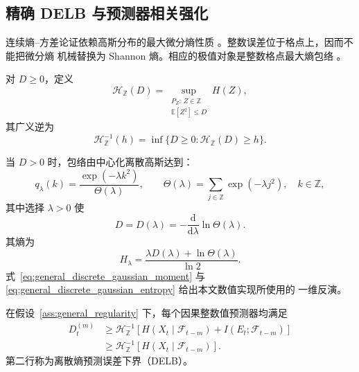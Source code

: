 \subsection{精确 DELB 与预测器相关强化}
\label{subsec:discrete_bound}

连续熵--方差论证依赖高斯分布的最大微分熵性质
\citep{fang_variance_bounds}。整数误差位于格点上，因而不能把微分熵
机械替换为 Shannon 熵。相应的极值对象是整数格点最大熵包络
\citep{massey_integer_entropy}。

\begin{Definition}[整数最大熵包络]
\label{def:integer_entropy_envelope}
对 \(D\geq0\)，定义
\begin{equation}
\mathcal H_{\mathbb Z}(D)
=
\sup_{\substack{P_Z:\,Z\in\mathbb Z\\\mathbb E[Z^2]\leq D}}H(Z),
\label{eq:integer_entropy_envelope}
\end{equation}
其广义逆为
\begin{equation}
\mathcal H_{\mathbb Z}^{-1}(h)
=
\inf\{D\geq0:\mathcal H_{\mathbb Z}(D)\geq h\}.
\label{eq:integer_entropy_inverse}
\end{equation}
\end{Definition}

当 \(D>0\) 时，包络由中心化离散高斯达到：
\begin{equation}
q_\lambda(k)
=
\frac{\exp(-\lambda k^2)}{\Theta(\lambda)},
\qquad
\Theta(\lambda)=\sum_{j\in\mathbb Z}\exp(-\lambda j^2),
\quad k\in\mathbb Z,
\label{eq:general_discrete_gaussian}
\end{equation}
其中选择 \(\lambda>0\) 使
\begin{equation}
D=D(\lambda)
=-\frac{\mathrm d}{\mathrm d\lambda}\ln\Theta(\lambda).
\label{eq:general_discrete_gaussian_moment}
\end{equation}
其熵为
\begin{equation}
H_\lambda
=
\frac{\lambda D(\lambda)+\ln\Theta(\lambda)}{\ln2}.
\label{eq:general_discrete_gaussian_entropy}
\end{equation}
式~\eqref{eq:general_discrete_gaussian_moment} 与
\eqref{eq:general_discrete_gaussian_entropy} 给出本文数值实现所使用的
一维反演。

\begin{Theorem}[精确离散熵预测误差下界]
\label{thm:exact_delb}
在假设~\ref{ass:general_regularity} 下，每个因果整数值预测器均满足
\begin{align}
D_t^{(m)}
&\geq
\mathcal H_{\mathbb Z}^{-1}\!\left[
H(X_t\mid\mathcal F_{t-m})
+I(E_t;\mathcal F_{t-m})
\right]
\label{eq:general_predictor_dependent_delb}\\
&\geq
\mathcal H_{\mathbb Z}^{-1}\!\left[
H(X_t\mid\mathcal F_{t-m})
\right].
\label{eq:general_universal_delb}
\end{align}
第二行称为离散熵预测误差下界（DELB）。
\end{Theorem}

